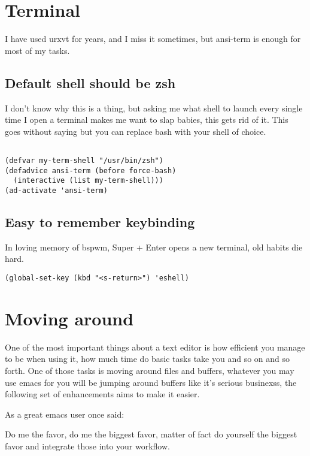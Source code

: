 \documentclass[12pt]{article}
\begin{document}
\section{Terminal}
\label{sec:orgaedd150}

I have used urxvt for years, and I miss it sometimes, but ansi-term is enough for most of my tasks.
\subsection{Default shell should be zsh}
\label{sec:org012277c}

I don’t know why this is a thing, but asking me what shell to launch every single time I open a terminal makes me want to slap babies, this gets rid of it. This goes without saying but you can replace bash with your shell of choice.
\begin{verbatim}

(defvar my-term-shell "/usr/bin/zsh")
(defadvice ansi-term (before force-bash)
  (interactive (list my-term-shell)))
(ad-activate 'ansi-term)
\end{verbatim}

\subsection{Easy to remember keybinding}
\label{sec:org52af06b}

In loving memory of bspwm, Super + Enter opens a new terminal, old habits die hard.
\begin{verbatim}
(global-set-key (kbd "<s-return>") 'eshell)
\end{verbatim}

\section{Moving around}
\label{sec:orga71228a}

One of the most important things about a text editor is how efficient
you manage to be when using it, how much time do basic tasks take you
and so on and so forth. One of those tasks is moving around files and
buffers, whatever you may use emacs for you will be jumping around
buffers like it’s serious businexss, the following set of enhancements
aims to make it easier.

As a great emacs user once said:

Do me the favor, do me the biggest favor, matter of fact do
yourself the biggest favor and integrate those into your workflow.
\end{document}
